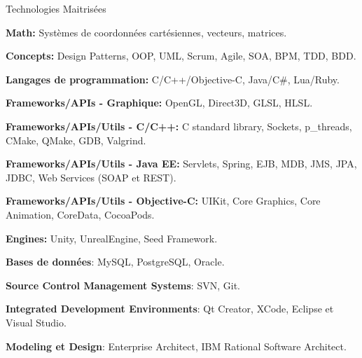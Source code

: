 \documentclass{resume}
\begin{document}
  \begin{rSection}{Technologies Maitrisées}
    \begin{rSubsection}{}{}{}{}
      \item {\bf Math:} Systèmes de coordonnées cartésiennes, vecteurs, matrices.
      \item {\bf Concepts:} Design Patterns, OOP, UML, Scrum, Agile, SOA, BPM, TDD, BDD.
      \item {\bf Langages de programmation:} C/C++/Objective-C, Java/C#, Lua/Ruby.
      \item {\bf Frameworks/APIs - Graphique:} OpenGL, Direct3D, GLSL, HLSL.
      \item {\bf Frameworks/APIs/Utils - C/C++:} C standard library, Sockets, p\_threads, CMake, QMake, GDB, Valgrind.
      \item {\bf Frameworks/APIs/Utils - Java EE:} Servlets, Spring, EJB, MDB, JMS, JPA, JDBC, Web Services (SOAP et REST).
      \item {\bf Frameworks/APIs/Utils - Objective-C:} UIKit, Core Graphics, Core Animation, CoreData, CocoaPods.
      \item {\bf Engines:} Unity, UnrealEngine, Seed Framework.
      \item {\bf Bases de données}: MySQL, PostgreSQL, Oracle.
      \item {\bf Source Control Management Systems}: SVN, Git.
      \item {\bf Integrated Development Environments}: Qt Creator, XCode, Eclipse et Visual Studio.
      \item {\bf Modeling et Design}: Enterprise Architect, IBM Rational Software Architect.
    \end{rSubsection}
  \end{rSection}
  
\end{document}
